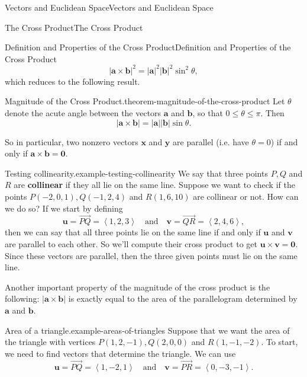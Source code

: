 \documentclass[10pt,]{book}
\newcommand{\terminology}[1]{\textbf{#1}}
\numberwithin{equation}{section}
\newcommand{\vv}[1]{\mathbf{#1}}
\newcommand{\dotprod}[1]{\left\langle #1 \right\rangle}
\begin{document}
\begin{chapterptx}{Vectors and Euclidean Space}{}{Vectors and Euclidean Space}{}{}
\begin{sectionptx}{The Cross Product}{}{The Cross Product}{}{}
\begin{subsectionptx}{Definition and Properties of the Cross Product}{}{Definition and Properties of the Cross Product}{}{}
%
\begin{equation*}
|\vv{a}\times\vv{b}|^{2} = |\vv{a}|^{2}|\vv{b}|^{2}\sin^{2}\theta,
\end{equation*}
\hypertarget{p-959}{}%
which reduces to the following result.%
\begin{theorem}{Magnitude of the Cross Product.}{}{theorem-magnitude-of-the-cross-product}%
\hypertarget{p-960}{}%
Let \(\theta\) denote the acute angle between the vectors \(\vv{a}\) and \(\vv{b}\), so that \(0\leq\theta\leq\pi\). Then%
%
\begin{equation*}
|\vv{a}\times\vv{b}| = |\vv{a}||\vv{b}|\sin\theta.
\end{equation*}
\end{theorem}
\hypertarget{p-961}{}%
So in particular, two nonzero vectors \(\vv{x}\) and \(\vv{y}\) are parallel (i.e. have \(\theta=0\)) if and only if \(\vv{a}\times\vv{b} = \vv{0}\).%
\begin{example}{Testing collinearity.}{example-testing-collinearity}%
\hypertarget{p-962}{}%
We say that three points \(P,Q\) and \(R\) are \terminology{collinear} if they all lie on the same line. Suppose we want to check if the points \(P(-2,0,1), Q(-1,2,4)\) and \(R(1,6,10)\) are collinear or not. How can we do so? If we start by defining%
%
\begin{equation*}
\vv{u} = \vec{PQ} = \dotprod{1,2,3}\quad\text{and}\quad \vv{v} = \vec{QR} = \dotprod{2,4,6},
\end{equation*}
\hypertarget{p-963}{}%
then we can say that all three points lie on the same line if and only if \(\vv{u}\) and \(\vv{v}\) are parallel to each other. So we'll compute their cross product to get \(\vv{u}\times\vv{v} = \vv{0}\). Since these vectors are parallel, then the three given points must lie on the same line.%
\end{example}
\hypertarget{p-964}{}%
Another important property of the magnitude of the cross product is the following: \(|\vv{a}\times\vv{b}|\) is exactly equal to the area of the parallelogram determined by \(\vv{a}\) and \(\vv{b}\).%
\begin{example}{Area of a triangle.}{example-areas-of-triangles}%
\hypertarget{p-965}{}%
Suppose that we want the area of the triangle with vertices \(P(1,2,-1), Q(2,0,0)\) and \(R(1,-1,-2)\). To start, we need to find vectors that determine the triangle. We can use%
%
\begin{equation*}
\vv{u} = \vec{PQ} = \dotprod{1,-2,1}\quad\text{and}\quad\vv{v} = \vec{PR} = \dotprod{0,-3,-1}.

\end{equation*}
\end{example}
\end{subsectionptx}
\end{sectionptx}
\end{chapterptx}
\end{document}
